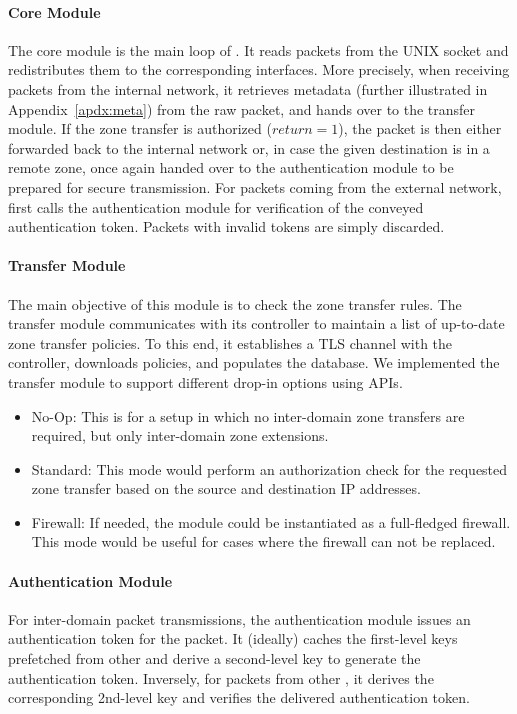 \paragraph{Core Module}
The core module is the main loop of \tp. It reads packets from the UNIX socket and
redistributes them to the corresponding interfaces. More precisely, when receiving packets
from the internal network, it retrieves metadata (further illustrated in
Appendix~\ref{apdx:meta}) from the raw packet, and hands over to the transfer module.
If the zone transfer is authorized ($return=1$),
the packet is then either forwarded back to the internal network or, in case the given destination is in a remote zone, once again handed over to the authentication module to be prepared for secure transmission.
For packets coming from the external network, \tp first calls the authentication module for
verification of the conveyed authentication token. Packets with invalid tokens are simply discarded.

\paragraph{Transfer Module}
The main objective of this module is to check the zone transfer rules. The transfer
module communicates with its controller to maintain a list of up-to-date zone transfer policies.
To this end, it establishes a TLS channel with the controller, downloads policies,
and populates the database.
We implemented the transfer module to support different drop-in options using APIs.

\begin{itemize}
	\item No-Op: This is for a setup in which no inter-domain zone transfers are required,
	      but only inter-domain zone extensions.
	\item Standard: This mode would perform an authorization check for the requested
	      zone transfer based on the source and destination IP addresses.
	\item Firewall: If needed, the module could be instantiated as a full-fledged firewall.
	      This mode would be useful for cases where the firewall can not be replaced.
\end{itemize}

\paragraph{Authentication Module}
For inter-domain packet transmissions, the authentication module issues an
authentication token for the packet. It (ideally) caches the first-level keys prefetched
from other \tps and derive a second-level key to generate the authentication token.
Inversely, for packets from other \tps, it derives the corresponding 2nd-level key
and verifies the delivered authentication token. 

